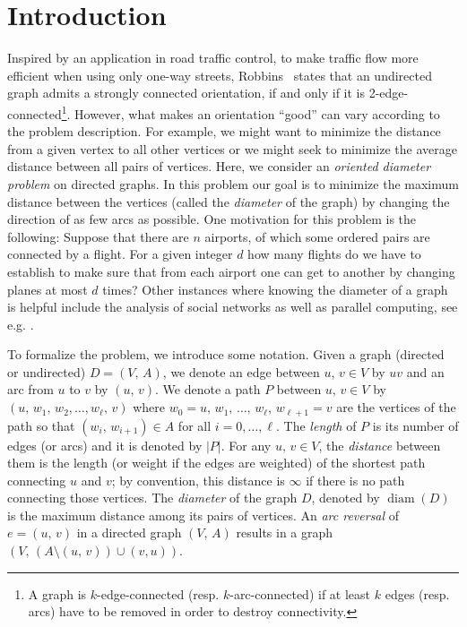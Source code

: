 \documentclass[11pt, twoside]{article}
\numberwithin{equation}{section}
\numberwithin{table}{section}
\numberwithin{figure}{section}
\theoremstyle{definition}
\theoremstyle{definition}
\theoremstyle{definition}
\begin{document}
\section{Introduction\label{sec:intro}} %
Inspired by an application in road traffic control, to make traffic flow more efficient when using only one-way streets,  Robbins~\cite{robbins1939strongconnectivity} states that an undirected graph admits a strongly connected orientation, if and only if it is 2-edge-connected\footnote{A graph is $k$-edge-connected (resp. $k$-arc-connected) if at least $k$ edges (resp. arcs) have to be removed in order to destroy connectivity.}.
However, what makes an orientation ``good'' can vary according to the problem description. For example, we might want to minimize the distance from a given vertex to all other vertices or we might seek to minimize the average distance between all pairs of vertices. Here, we consider an \emph{oriented diameter problem} on directed graphs. In this problem our goal is to minimize the maximum distance between the vertices (called the \emph{diameter} of the graph) by changing the direction of as few arcs as possible. One motivation for this problem is the following: Suppose that there are $n$ airports, of which some ordered pairs are connected by a flight. For a given integer $d$ how many flights do we have to establish to make sure that from each airport one can get to another by changing planes at most $d$ times? 
Other instances where knowing the diameter of a graph is helpful include the analysis of social networks as well as parallel computing, see e.g. \cite{WattsStrogatzapplication1, Chungapplication2}.

To formalize the problem, we introduce some notation. Given a graph (directed or undirected) $D=(V, \, A)$, we denote an edge between $u$, $v \in V$ by $uv$ and an arc from $u$ to $v$ by $(u, \, v)$. We denote a path $P$ between $u, \, v \in V$ by $(u, \, w_1, \, w_2, \dots, w_\ell, \, v)$ where $w_0=u, \, w_1, \, \dots, \, w_\ell, \, w_{\ell+1}=v$ are the vertices  of the path so that $(w_i, \, w_{i+1}) \in A$ for all $i= 0, \dots,\ell$. The \emph{length} of $P$ is its number of edges (or arcs) and it is denoted by $|P|$.
For any $u, \, v \in V$, the \emph{distance} between them is the length (or weight if the edges are weighted) of the shortest path connecting $u$ and $v$; by convention, this distance is $\infty$ if there is no path connecting those vertices. The \emph{diameter} of the graph $D$, denoted by $\operatorname{diam}(D)$ is the maximum distance among its pairs of vertices.
An \emph{arc reversal} of $e=(u, \, v)$ in a directed graph $(V, \, A)$ results in a graph $(V, \, (A \setminus (u, \, v))\cup (v,u) )$. 
\end{document}
